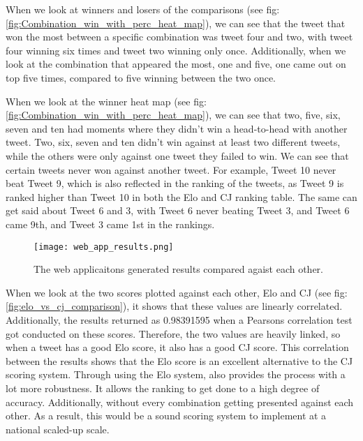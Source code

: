 	When we look at winners and losers of the comparisons (see fig: \ref{fig:Combination_win_with_perc_heat_map}), we can see that the tweet that won the most between a specific combination was tweet four and two, with tweet four winning six times and tweet two winning only once. Additionally, when we look at the combination that appeared the most, one and five, one came out on top five times, compared to five winning between the two once.
	
	When we look at the winner heat map (see fig: \ref{fig:Combination_win_with_perc_heat_map}), we can see that two, five, six, seven and ten had moments where they didn't win a head-to-head with another tweet. Two, six, seven and ten didn't win against at least two different tweets, while the others were only against one tweet they failed to win. We can see that certain tweets never won against another tweet. For example, Tweet 10 never beat Tweet 9, which is also reflected in the ranking of the tweets, as Tweet 9 is ranked higher than Tweet 10 in both the Elo and CJ ranking table. The same can get said about Tweet 6 and 3, with Tweet 6 never beating Tweet 3, and Tweet 6 came 9th, and Tweet 3 came 1st in the rankings.
	
		
	
\begin{figure}[t]
	\centering
	\texttt{[image: web\_app\_results.png]}
	\caption{The web applicaitons generated results compared agaist each other.}
	\label{fig:web_app_results}
	
\end{figure}
	

	When we look at the two scores plotted against each other, Elo and CJ (see fig: \ref{fig:elo_vs_cj_comparison}), it shows that these values are linearly correlated. Additionally, the results returned as 0.98391595 when a Pearsons correlation test got conducted on these scores. Therefore, the two values are heavily linked, so when a tweet has a good Elo score, it also has a good CJ score. This correlation between the results shows that the Elo score is an excellent alternative to the CJ scoring system. Through using the Elo system, also provides the process with a lot more robustness. It allows the ranking to get done to a high degree of accuracy. Additionally, without every combination getting presented against each other. As a result, this would be a sound scoring system to implement at a national scaled-up scale.

